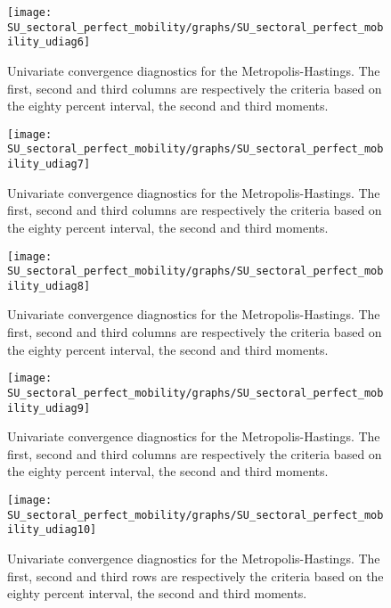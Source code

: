 \begin{figure}[H]
\centering 
\texttt{[image: SU\_sectoral\_perfect\_mobility/graphs/SU\_sectoral\_perfect\_mobility\_udiag6]}
\caption{Univariate convergence diagnostics for the Metropolis-Hastings.
The first, second and third columns are respectively the criteria based on
the eighty percent interval, the second and third moments.}\label{Fig:UnivariateDiagnostics:6}
\end{figure}

\begin{figure}[H]
\centering 
\texttt{[image: SU\_sectoral\_perfect\_mobility/graphs/SU\_sectoral\_perfect\_mobility\_udiag7]}
\caption{Univariate convergence diagnostics for the Metropolis-Hastings.
The first, second and third columns are respectively the criteria based on
the eighty percent interval, the second and third moments.}\label{Fig:UnivariateDiagnostics:7}
\end{figure}

\begin{figure}[H]
\centering 
\texttt{[image: SU\_sectoral\_perfect\_mobility/graphs/SU\_sectoral\_perfect\_mobility\_udiag8]}
\caption{Univariate convergence diagnostics for the Metropolis-Hastings.
The first, second and third columns are respectively the criteria based on
the eighty percent interval, the second and third moments.}\label{Fig:UnivariateDiagnostics:8}
\end{figure}

\begin{figure}[H]
\centering 
\texttt{[image: SU\_sectoral\_perfect\_mobility/graphs/SU\_sectoral\_perfect\_mobility\_udiag9]}
\caption{Univariate convergence diagnostics for the Metropolis-Hastings.
The first, second and third columns are respectively the criteria based on
the eighty percent interval, the second and third moments.}\label{Fig:UnivariateDiagnostics:9}
\end{figure}

\begin{figure}[H]
\centering 
\texttt{[image: SU\_sectoral\_perfect\_mobility/graphs/SU\_sectoral\_perfect\_mobility\_udiag10]}
\caption{Univariate convergence diagnostics for the Metropolis-Hastings.
The first, second and third rows are respectively the criteria based on
the eighty percent interval, the second and third moments.}\label{Fig:UnivariateDiagnostics:10}
\end{figure}

